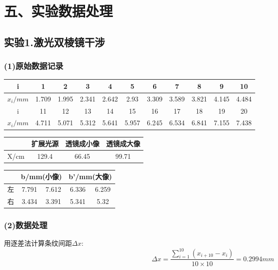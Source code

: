 \documentclass[11pt,a4paper,oneside]{article}
\begin{document}
\section*{五、实验数据处理}
\subsection*{实验1.激光双棱镜干涉}
\subsubsection*{(1)原始数据记录}

\begin{center}
\begin{table}[htbp]
\begin{tabular}{|c|c|c|c|c|c|c|c|c|c|c|}
\hline 
i & 1 & 2 & 3 & 4 & 5 & 6 & 7 & 8 & 9 & 10 
\\ 
\hline 
$x_i/mm$
&1.709&1.995&2.341&2.642&2.93&3.309&3.589&3.821&4.145&4.484
\\ 
\hline 
i & 11 & 12 & 13 & 14 & 15 & 16 & 17 & 18 & 19 & 20 
\\ 
\hline 
$x_i/mm$ 
&4.711&5.071&5.312&5.641&5.957&6.245&6.534&6.841&7.155&7.438
\\ 
\hline 
\end{tabular} 
\end{table}
\begin{table}[htbp]
\begin{tabular}{|c|c|c|c|}
\hline 
   & 扩展光源 & 透镜成小像 & 透镜成大像 \\ 
\hline 
X/cm 
&129.4
&66.45
&99.71

\\
\hline 
\end{tabular} 
\end{table}
\begin{table}[htbp]
\begin{tabular}{|c|c|c|c|c|}
\hline  
 & \multicolumn{2}{|c|}{b/mm(小像) }& \multicolumn{2}{|c|}{b'/mm(大像)} \\ 
\hline 
左 & 7.791 &7.612 & 6.336 & 6.259 \\ 
\hline 
右 & 3.434 &3.391 & 5.341 & 5.32 \\ 
\hline 
\end{tabular}
\end{table}
\end{center}

\subsubsection*{(2)数据处理}
用逐差法计算条纹间距${\Delta}x$:
$${\Delta}x = \displaystyle\frac{\sum\limits_{i=1}^{10}(x_{i+10}-x_i)}{10{\times}10} = 0.2994mm$$
\end{document}
